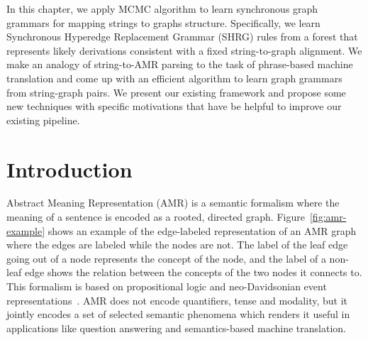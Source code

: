 In this chapter, we apply MCMC algorithm to learn synchronous graph grammars for mapping strings
to graphs structure. Specifically, we learn Synchronous Hyperedge Replacement Grammar (SHRG) rules from a forest that represents likely derivations consistent with a fixed string-to-graph 
alignment. We make an analogy of string-to-AMR parsing to the task of phrase-based machine translation and
come up with an efficient algorithm to learn graph grammars from string-graph pairs. We present our existing framework and propose some new techniques with specific motivations that have
be helpful to improve our existing pipeline.
\section{Introduction} 
Abstract Meaning Representation (AMR) \cite{banarescu2013abstract} is a semantic formalism where the meaning 
of a sentence is encoded as a rooted, directed graph. 
Figure~\ref{fig:amr-example} shows an example of the edge-labeled representation of an AMR 
graph where the edges are labeled while the nodes are not. The label of the leaf edge going out of a node represents 
the concept of the node, and the label of a non-leaf edge shows the relation between the concepts of the two nodes it connects to. 
This formalism is based on propositional logic and neo-Davidsonian event representations~\cite{parsons1990events,Davidson:1967}.
AMR does not encode quantifiers, tense and modality, but it jointly encodes a set of selected semantic phenomena which renders
it useful in applications like question answering and semantics-based machine translation.

